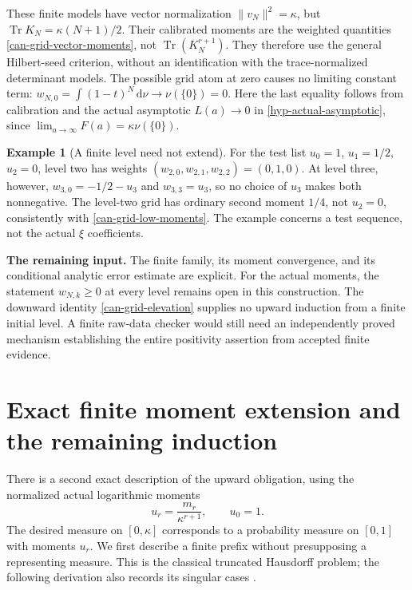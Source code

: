 \documentclass[11pt,a4paper]{article}
\numberwithin{equation}{section}
\theoremstyle{definition}
\newtheorem{example}[theorem]{Example}
\theoremstyle{remark}
\newcommand{\norm}[1]{\lVert #1\rVert}
\newcommand{\dd}{\,\mathrm d}
\DeclareMathOperator{\Tr}{Tr}
\begin{document}
These finite models have vector normalization $\norm{v_N}^2=\kappa$,
but $\Tr K_N=\kappa(N+1)/2$. Their calibrated moments are the weighted
quantities \eqref{can-grid-vector-moments}, not $\Tr(K_N^{r+1})$.
They therefore use the general Hilbert-seed criterion, without an
identification with the trace-normalized determinant models.
The possible grid atom at zero causes no limiting constant term:
$w_{N,0}=\int(1-t)^N\dd\nu\to\nu(\{0\})=0$. Here the last equality
follows from calibration and the actual asymptotic $L(a)\to0$ in
\eqref{hyp-actual-asymptotic}, since
$\lim_{a\to\infty}F(a)=\kappa\nu(\{0\})$.

\begin{example}[A finite level need not extend]\label{can-grid-finite-obstruction}
For the test list $u_0=1$, $u_1=1/2$, $u_2=0$, level two has weights
$(w_{2,0},w_{2,1},w_{2,2})=(0,1,0)$. At level three, however,
$w_{3,0}=-1/2-u_3$ and $w_{3,3}=u_3$, so no choice of $u_3$ makes
both nonnegative. The level-two grid has ordinary second moment $1/4$,
not $u_2=0$, consistently with \eqref{can-grid-low-moments}.
The example concerns a test sequence, not the actual $\xi$ coefficients.
\end{example}

\begin{scopebox}
\small\textbf{The remaining input.}
The finite family, its moment convergence, and its conditional analytic
error estimate are explicit. For the actual moments, the statement
$w_{N,k}\geq0$ at every level remains open in this construction.
The downward identity \eqref{can-grid-elevation} supplies no upward
induction from a finite initial level. A finite raw-data checker would
still need an independently proved mechanism establishing the entire
positivity assertion from accepted finite evidence.
\end{scopebox}


\section[Exact moment extension]{Exact finite moment extension and the remaining induction}
\label{sec:moment-extension}

There is a second exact description of the upward obligation, using
the normalized actual logarithmic moments
\begin{equation}\label{can-ext-eq:normalized}
 u_r=\frac{m_r}{\kappa^{r+1}},\qquad u_0=1.
\end{equation}
The desired measure on $[0,\kappa]$ corresponds to a probability
measure on $[0,1]$ with moments $u_r$. We first describe a finite
prefix without presupposing a representing measure. This is the
classical truncated Hausdorff problem; the following derivation also
records its singular cases \cite[Section~4]{curto-fialkow}.
\end{document}
